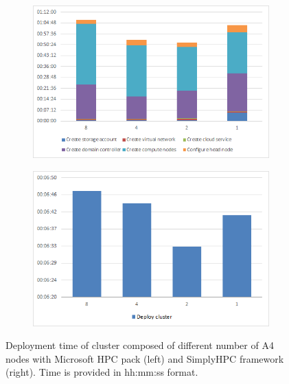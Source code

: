 \documentclass[3p,times]{elsarticle}
\begin{document}

\begin{figure}
\centering
\begin{subfigure}{.5\textwidth}
  \centering
			\includegraphics[width=\linewidth]{hpcDeployTime}	
  \label{fig:hpcgDeploy}
\end{subfigure}%
\begin{subfigure}{.5\textwidth}
  \centering
  \includegraphics[width=\linewidth]{simplyHpcDeployTime}
  \label{fig:simplyHpcDeploy}
\end{subfigure}
\caption{Deployment time of cluster composed of different number of A4 nodes with Microsoft HPC pack (left) and SimplyHPC framework (right). Time is provided in hh:mm:ss format.}
\label{fig:deployTime}
\end{figure}
\end{document}
